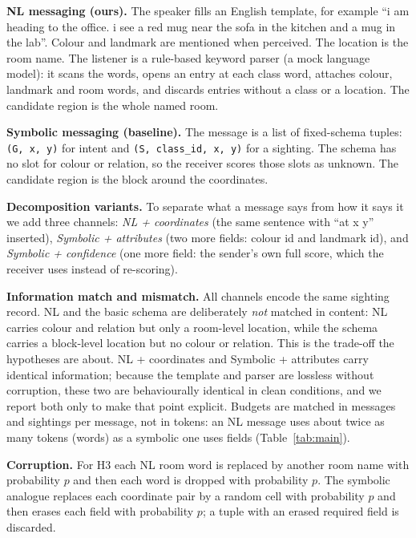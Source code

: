 \textbf{NL messaging (ours).} The speaker fills an English template, for example ``i am heading to the office. i see a red mug near the sofa in the kitchen and a mug in the lab''. Colour and landmark are mentioned when perceived. The location is the room name. The listener is a rule-based keyword parser (a mock language model): it scans the words, opens an entry at each class word, attaches colour, landmark and room words, and discards entries without a class or a location. The candidate region is the whole named room.

\textbf{Symbolic messaging (baseline).} The message is a list of fixed-schema tuples: \texttt{(G, x, y)} for intent and \texttt{(S, class\_id, x, y)} for a sighting. The schema has no slot for colour or relation, so the receiver scores those slots as unknown. The candidate region is the block around the coordinates.

\textbf{Decomposition variants.} To separate what a message says from how it says it we add three channels: \emph{NL + coordinates} (the same sentence with ``at x y'' inserted), \emph{Symbolic + attributes} (two more fields: colour id and landmark id), and \emph{Symbolic + confidence} (one more field: the sender's own full score, which the receiver uses instead of re-scoring).

\textbf{Information match and mismatch.} All channels encode the same sighting record. NL and the basic schema are deliberately \emph{not} matched in content: NL carries colour and relation but only a room-level location, while the schema carries a block-level location but no colour or relation. This is the trade-off the hypotheses are about. NL + coordinates and Symbolic + attributes carry identical information; because the template and parser are lossless without corruption, these two are behaviourally identical in clean conditions, and we report both only to make that point explicit. Budgets are matched in messages and sightings per message, not in tokens: an NL message uses about twice as many tokens (words) as a symbolic one uses fields (Table~\ref{tab:main}).

\textbf{Corruption.} For H3 each NL room word is replaced by another room name with probability $p$ and then each word is dropped with probability $p$. The symbolic analogue replaces each coordinate pair by a random cell with probability $p$ and then erases each field with probability $p$; a tuple with an erased required field is discarded.
